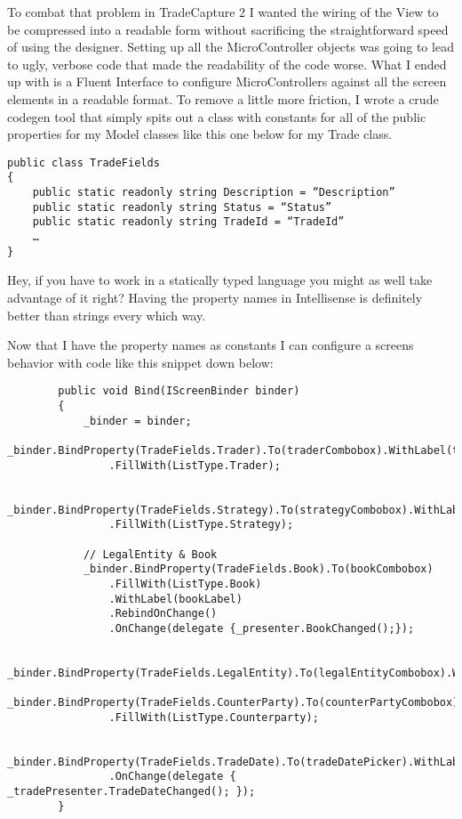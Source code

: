 \documentclass{article}
\begin{document}
{To combat that problem in TradeCapture 2 I wanted the wiring of the View to be compressed into a readable form without sacrificing the straightforward speed of using the designer.  Setting up all the MicroController objects was going to lead to ugly, verbose code that made the readability of the code worse.  What I ended up with is a Fluent Interface to configure MicroControllers against all the screen elements in a readable format.  To remove a little more friction, I wrote a crude codegen tool that simply spits out a class with constants for all of the public properties for my Model classes like this one below for my Trade class.
\newpage
\begin{lstlisting}
public class TradeFields
{
    public static readonly string Description = “Description”
    public static readonly string Status = “Status”
    public static readonly string TradeId = “TradeId”
    …
}
\end{lstlisting}

Hey, if you have to work in a statically typed language you might as well take advantage of it right?  Having the property names in Intellisense is definitely better than strings every which way. 

Now that I have the property names as constants I can configure a screens behavior with code like this snippet down below:
\begin{lstlisting}
        public void Bind(IScreenBinder binder)
        {
            _binder = binder;
            _binder.BindProperty(TradeFields.Trader).To(traderCombobox).WithLabel(traderLabel)
                .FillWith(ListType.Trader);

            _binder.BindProperty(TradeFields.Strategy).To(strategyCombobox).WithLabel(strategyLabel)
                .FillWith(ListType.Strategy);

            // LegalEntity & Book
            _binder.BindProperty(TradeFields.Book).To(bookCombobox)
                .FillWith(ListType.Book)
                .WithLabel(bookLabel)
                .RebindOnChange()
                .OnChange(delegate {_presenter.BookChanged();}); 

            _binder.BindProperty(TradeFields.LegalEntity).To(legalEntityCombobox).WithLabel(legalEntityLabel);
            _binder.BindProperty(TradeFields.CounterParty).To(counterPartyCombobox).WithLabel(counterPartyLabel)
                .FillWith(ListType.Counterparty); 

            _binder.BindProperty(TradeFields.TradeDate).To(tradeDatePicker).WithLabel(tradeDateLabel)
                .OnChange(delegate { _tradePresenter.TradeDateChanged(); });
        }
\end{lstlisting}

}
\end{document}

